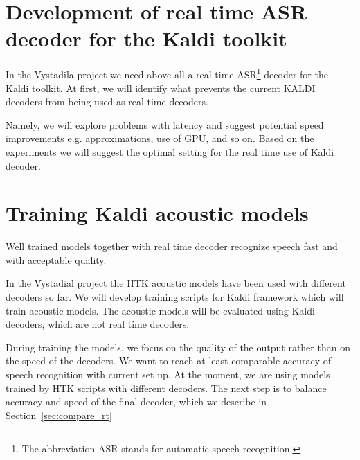 


\section{Development of real time ASR decoder for the Kaldi toolkit}
\label{sec:kaldi_rt_decoder}
In the Vystadila project we need above all a real time ASR\footnote{The abbreviation ASR stands for automatic speech recognition.} decoder for the Kaldi toolkit. At first, we will identify what prevents the current KALDI decoders from being used as real time decoders. 

Namely, we will explore problems with latency and suggest potential speed improvements e.g. approximations, use of GPU, and so on. Based on the experiments we will suggest the optimal setting for the real time use of Kaldi decoder.


\section{Training Kaldi acoustic models} 
\label{sec:training_kaldi_acoustic_models}
Well trained models together with real time decoder recognize speech fast and with acceptable quality.

In the Vystadial project the HTK acoustic models have been used with different decoders so far. We will develop training scripts for Kaldi framework which will train acoustic models. The acoustic models will be evaluated using Kaldi decoders, which are not real time decoders. 

During training the models, we focus on the quality of the output rather than on the speed of the decoders. We want to reach at least comparable accuracy of speech recognition with current set up. At the moment, we are using models trained by HTK scripts with different decoders. The next step is to balance accuracy and speed of the final decoder, which we describe in Section~\ref{sec:compare_rt}

